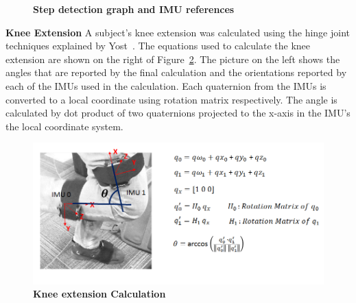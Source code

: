 \documentclass[conference]{IEEEtran}
\begin{document}
\begin{figure}[h]
  \centering
  \label{fig:swing}
  \caption{{\bf Step detection graph and IMU references}}
\end{figure}

{\bf Knee Extension} A subject's knee extension was calculated using the hinge joint
techniques explained by Yost~\cite{yost}. The equations used to calculate the knee
extension are shown on the right of Figure~\ref{fig:knees}. The picture on the left shows
the angles that are reported by the final calculation and the orientations reported by
each of the IMUs used in the calculation. Each quaternion from the IMUs is converted to a
local coordinate using rotation matrix respectively. The angle is calculated by dot
product of two quaternions projected to the x-axis in the IMU’s the local coordinate
system.


\begin{figure}[h]
  \centering
  \includegraphics[width=0.99\columnwidth]{figs/knees2}
  \caption{{\bf Knee extension Calculation}}
  \label{fig:knees}
\end{figure}
\end{document}
